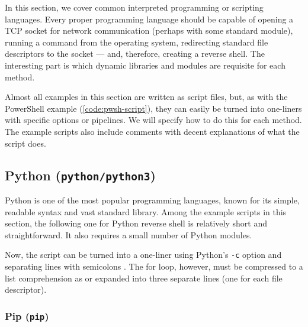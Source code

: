 In this section, we cover common interpreted programming or scripting languages. Every proper programming language should be capable of opening a TCP socket for network communication (perhaps with some standard module), running a command from the operating system, redirecting standard file descriptors to the socket — and, therefore, creating a reverse shell. The interesting part is which dynamic libraries and modules are requisite for each method.

Almost all examples in this section are written as script files, but, as with the PowerShell example (\cref{code:pwsh-script}), they can easily be turned into one-liners with specific options or pipelines. We will specify how to do this for each method. The example scripts also include comments with decent explanations of what the script does.


\subsection{Python (\texttt{python/python3})}


Python is one of the most popular programming languages, known for its simple, readable syntax and vast standard library. Among the example scripts in this section, the following one for Python reverse shell is relatively short and straightforward. It also requires a small number of Python modules.



Now, the script can be turned into a one-liner using Python's \texttt{-c} option and separating lines with semicolons \cite{python-man}. The for loop, however, must be compressed to a list comprehension as  or expanded into three separate lines (one for each file descriptor).



\subsubsection{Pip (\texttt{pip})}

